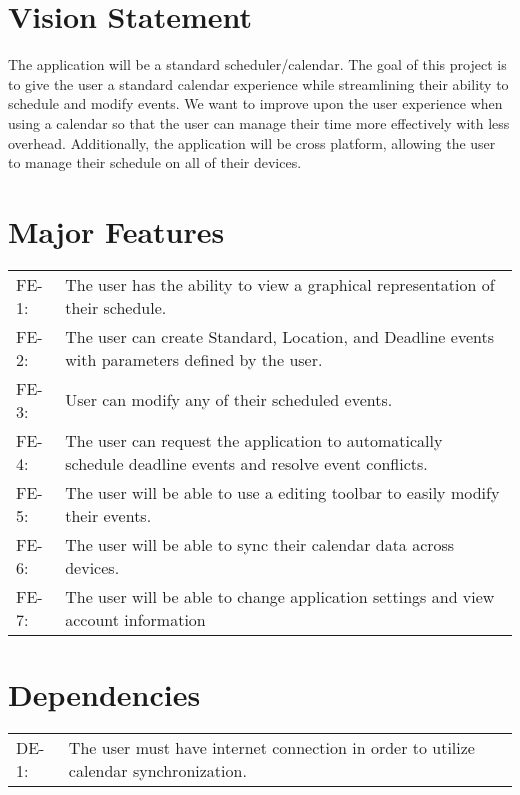 \documentclass{scrreprt}
\begin{document}
\section{Vision Statement}
The application will be a standard scheduler/calendar. The goal of this project is to give the user a standard calendar experience while streamlining their ability to schedule and modify events.  We want to improve upon the user experience when using a calendar so that the user can manage their time more effectively with less overhead. Additionally, the application will be cross platform, allowing the user to manage their schedule on all of their devices.\\

\section{Major Features}
\begin{center}
\begin{tabular}{  p{1cm}  p{13cm}  }
FE-1: & The user has the ability to view a graphical representation of their schedule.\\
FE-2: & The user can create Standard, Location, and Deadline events with parameters defined by the user.\\
FE-3: & User can modify any of their scheduled events.\\
FE-4: & The user can request the application to automatically schedule deadline events and resolve event conflicts.\\
FE-5: & The user will be able to use a editing toolbar to easily modify their events.\\
FE-6: & The user will be able to sync their calendar data across devices.\\
FE-7: & The user will be able to change application settings and view account information\\
\end{tabular}
\end{center}

\section{Dependencies}
\begin{center}
\begin{tabular}{  p{1cm}  p{13cm}  }
DE-1: & The user must have internet connection in order to utilize calendar synchronization.\\
\end{tabular}
\end{center}
\end{document}
